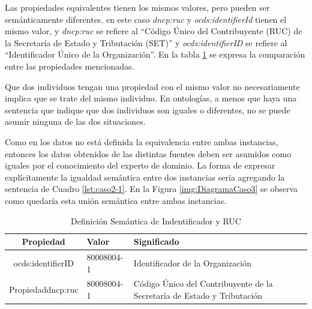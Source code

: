  Las propiedades equivalentes tienen los mismos valores, pero pueden ser semánticamente diferentes, en este caso \textit{dncp:ruc} y \textit{ocds:identifierId} tienen el mismo valor, y \textit{dncp:ruc} se refiere al “Código Único del Contribuyente (RUC) de la Secretaría de Estado y Tributación (SET)” y \textit{ocds:identifierID} se refiere al “Identificador Único de la Organización”. En la tabla \ref{table:semanticaID} se expresa la comparación entre las propiedades mencionadas.

 Que dos individuos tengan una propiedad con el mismo valor no necesariamente implica que se trate del mismo individuo. En ontologías, a menos que haya una sentencia que indique que dos individuos son iguales o diferentes, no se puede asumir ninguna de las dos situaciones. 

 Como en los datos no está definida la equivalencia entre ambas instancias, entonces los datos obtenidos de las distintas fuentes deben ser asumidos como iguales por el conocimiento del experto de dominio. La forma de expresar explícitamente la igualdad semántica entre dos instancias seria agregando la sentencia de Cuadro \ref{lst:caso2-1}. En la Figura \ref{img:DiagramaCaso3} se observa como quedaría esta unión semántica entre ambas instancias.
 


 \begin{table}[!htb]
    \centering
    \caption{Definición Semántica de Indentificador y RUC}
    \label{table:semanticaID}
    \resizebox{15cm}{!} {
    \begin{tabular}{|c|l|l|}
    \hline
    
Propiedad & Valor &  Significado \\ \hline

ocds:identifierID  & 80008004-1 &  Identificador de la Organización \\ \hline
Propiedaddncp:ruc & 80008004-1 &  Código Único del Contribuyente de la Secretaría de Estado y Tributación \\ \hline

    \end{tabular}
    }
    \end{table}

